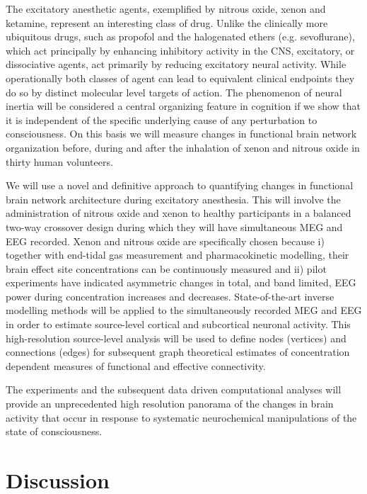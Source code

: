 \documentclass{article}
\begin{document}
The excitatory anesthetic agents, exemplified by nitrous oxide, xenon and ketamine, represent an interesting class of drug.  Unlike the clinically more ubiquitous drugs, such as propofol and the halogenated ethers (e.g. sevoflurane), which act principally by enhancing inhibitory activity in the CNS, excitatory, or dissociative agents, act primarily by reducing excitatory neural activity.  While operationally both classes of agent can lead to equivalent clinical endpoints they do so by distinct molecular level targets of action.  The phenomenon of neural inertia will be considered a central organizing feature in cognition if we show that it is independent of the specific underlying cause of any perturbation to consciousness.  On this basis we will measure changes in functional brain network organization before, during and after the inhalation of xenon and nitrous oxide in thirty human volunteers.

We will use a novel and definitive approach to quantifying changes in functional brain network architecture during excitatory anesthesia. This will involve the administration of nitrous oxide and xenon to healthy participants in a balanced two-way crossover design during which they will have simultaneous MEG and EEG recorded.  Xenon and nitrous oxide are specifically chosen because i) together with end-tidal gas measurement and pharmacokinetic modelling, their brain effect site concentrations can be continuously measured and ii) pilot experiments have indicated asymmetric changes in total, and band limited, EEG power during concentration increases and decreases.  State-of-the-art inverse modelling methods will be applied to the simultaneously recorded MEG and EEG in order to estimate source-level cortical and subcortical neuronal activity.  This high-resolution source-level analysis will be used to define nodes (vertices) and connections (edges) for subsequent graph theoretical estimates of concentration dependent measures of functional and effective connectivity.   

The experiments and the subsequent data driven computational analyses will provide an unprecedented high resolution panorama of the changes in brain activity that occur in response to systematic neurochemical manipulations of the state of consciousness.
\section{Discussion}
\end{document}

